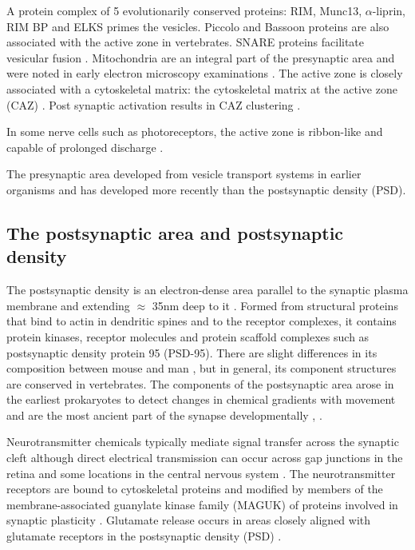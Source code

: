  
  A protein complex of 5 evolutionarily conserved proteins: RIM, Munc13, $\alpha$-liprin, RIM BP and ELKS \cite{sudhof2012presynaptic} primes the vesicles. Piccolo and Bassoon proteins are also associated with the active zone in vertebrates\cite{gundelfinger2016role}.  SNARE proteins facilitate vesicular fusion \cite{sudhof2012presynaptic}. Mitochondria \cite{lassek2014proteome} are an integral part of the presynaptic area and were noted in early electron microscopy  examinations \cite{gray1959electron}. The active zone is closely associated with a cytoskeletal matrix: the cytoskeletal matrix at the active zone (CAZ) \cite{schoch2006molecular}. Post synaptic activation results in CAZ clustering \cite{glebov2017nanoscale}. 
 
   In some nerve cells such as  photoreceptors, the active zone is ribbon-like and capable of prolonged discharge  \cite{ashery2014molecular}.  
 
 
The presynaptic area developed from vesicle transport systems in earlier organisms and has developed more recently than the postsynaptic density (PSD)\cite{emes2012evolution}.

 
\subsection{The postsynaptic area and postsynaptic density}
\label{sec:post synaptic area and post synaptic density}
The postsynaptic density is an electron-dense area parallel to the synaptic plasma membrane and extending $\approx$ 35nm deep to it \cite{harris2012ultrastructure}. Formed from structural proteins that bind to actin in dendritic spines and to the receptor complexes, it contains protein kinases, receptor molecules and protein scaffold complexes such as postsynaptic density protein 95 (PSD-95). There are slight differences in its composition between mouse and man \cite{bayes2012comparative}, but in general, its component structures are conserved in vertebrates. The components of the postsynaptic area arose in the earliest prokaryotes to detect changes in chemical gradients with movement and are the most ancient part of the synapse developmentally \cite{grant2018synapse}, \cite{emes2012evolution}. 

Neurotransmitter chemicals typically mediate signal transfer across the synaptic cleft although direct electrical transmission can occur across gap junctions in the retina and some locations in the central nervous system \cite{stewart2014structure}. The neurotransmitter receptors are bound to cytoskeletal proteins and modified by members of the membrane-associated guanylate kinase family (MAGUK) of proteins involved in synaptic plasticity \cite{zhu2016mechanistic}. Glutamate release occurs in areas closely aligned with glutamate receptors in the postsynaptic density (PSD) \cite{harris2012ultrastructure}.

